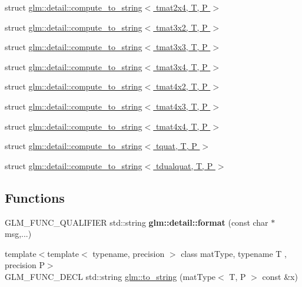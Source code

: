 \begin{DoxyCompactItemize}
\item 
struct \hyperlink{structglm_1_1detail_1_1compute__to__string_3_01tmat2x4_00_01_t_00_01_p_01_4}{glm\-::detail\-::compute\-\_\-to\-\_\-string$<$ tmat2x4, T, P $>$}
\item 
struct \hyperlink{structglm_1_1detail_1_1compute__to__string_3_01tmat3x2_00_01_t_00_01_p_01_4}{glm\-::detail\-::compute\-\_\-to\-\_\-string$<$ tmat3x2, T, P $>$}
\item 
struct \hyperlink{structglm_1_1detail_1_1compute__to__string_3_01tmat3x3_00_01_t_00_01_p_01_4}{glm\-::detail\-::compute\-\_\-to\-\_\-string$<$ tmat3x3, T, P $>$}
\item 
struct \hyperlink{structglm_1_1detail_1_1compute__to__string_3_01tmat3x4_00_01_t_00_01_p_01_4}{glm\-::detail\-::compute\-\_\-to\-\_\-string$<$ tmat3x4, T, P $>$}
\item 
struct \hyperlink{structglm_1_1detail_1_1compute__to__string_3_01tmat4x2_00_01_t_00_01_p_01_4}{glm\-::detail\-::compute\-\_\-to\-\_\-string$<$ tmat4x2, T, P $>$}
\item 
struct \hyperlink{structglm_1_1detail_1_1compute__to__string_3_01tmat4x3_00_01_t_00_01_p_01_4}{glm\-::detail\-::compute\-\_\-to\-\_\-string$<$ tmat4x3, T, P $>$}
\item 
struct \hyperlink{structglm_1_1detail_1_1compute__to__string_3_01tmat4x4_00_01_t_00_01_p_01_4}{glm\-::detail\-::compute\-\_\-to\-\_\-string$<$ tmat4x4, T, P $>$}
\item 
struct \hyperlink{structglm_1_1detail_1_1compute__to__string_3_01tquat_00_01_t_00_01_p_01_4}{glm\-::detail\-::compute\-\_\-to\-\_\-string$<$ tquat, T, P $>$}
\item 
struct \hyperlink{structglm_1_1detail_1_1compute__to__string_3_01tdualquat_00_01_t_00_01_p_01_4}{glm\-::detail\-::compute\-\_\-to\-\_\-string$<$ tdualquat, T, P $>$}
\end{DoxyCompactItemize}
\subsection*{Functions}
\begin{DoxyCompactItemize}
\item 
\hypertarget{namespaceglm_1_1detail_acd5305bbd1c5417b1eb770faf8229d14}{G\-L\-M\-\_\-\-F\-U\-N\-C\-\_\-\-Q\-U\-A\-L\-I\-F\-I\-E\-R std\-::string {\bfseries glm\-::detail\-::format} (const char $\ast$msg,...)}\label{namespaceglm_1_1detail_acd5305bbd1c5417b1eb770faf8229d14}

\item 
{\footnotesize template$<$template$<$ typename, precision $>$ class mat\-Type, typename T , precision P$>$ }\\G\-L\-M\-\_\-\-F\-U\-N\-C\-\_\-\-D\-E\-C\-L std\-::string \hyperlink{group__gtx__string__cast_ga7b4f9233593bbf1d53762f801ef56fe6}{glm\-::to\-\_\-string} (mat\-Type$<$ T, P $>$ const \&x)
\end{DoxyCompactItemize}


